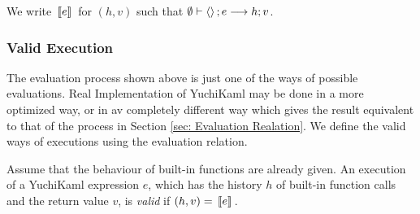 {}

{}

{}


{}

{}

\infrule[E-Abs]
{}
{}

We write $\,[\![e]\!]\,$ for $(h, v)$ such that $\emptyset \vdash \left\langle  \right\rangle; e \longrightarrow h; v$.

\subsubsection{Valid Execution}

The evaluation process shown above is just one of the ways of possible evaluations.
Real Implementation of YuchiKaml may be done in a more optimized way, or in av completely different way which gives the result equivalent to that of the process in Section \ref{sec: Evaluation Realation}.
We define the valid ways of executions using the evaluation relation.

\begin{definition}
    Assume that the behaviour of built-in functions are already given.
    An execution of a YuchiKaml expression $e$, which has the history $h$ of built-in function calls and the return value $v$, is \emph{valid} if $(h,v)=\,[\![e]\!]\,$.
\end{definition}
